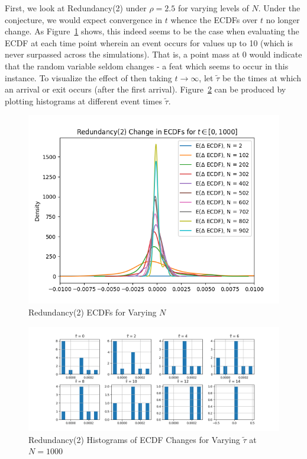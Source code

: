 First, we look at Redundancy(2) under $\rho = 2.5$ for varying levels of $N$. Under the conjecture, we would expect convergence in $t$ whence the ECDFs over $t$ no longer change. As Figure~\ref{fig:redecdf} shows, this indeed seems to be the case when evaluating the ECDF at each time point wherein an event occurs for values up to 10 (which is never surpassed across the simulations). That is, a point mass at $0$ would indicate that the random variable seldom changes - a feat which seems to occur in this instance. To visualize the effect of then taking $t \rightarrow \infty$, let $\tilde{\tau}$ be the times at which an arrival or exit occurs (after the first arrival). Figure~\ref{fig:taus} can be produced by plotting histograms at different event times $\tilde{\tau}$.

\begin{figure}
    \centering
    \includegraphics[width=0.7\linewidth]{redundancyecdf}
    \caption{Redundancy(2) ECDFs for Varying $N$}
    \label{fig:redecdf}
\end{figure}

\begin{figure}
    \centering
    \includegraphics[width=0.8\linewidth]{redtau}
    \caption{Redundancy(2) Histograms of ECDF Changes for Varying $\tilde \tau$ at $N=1000$}
    \label{fig:taus}
\end{figure}

